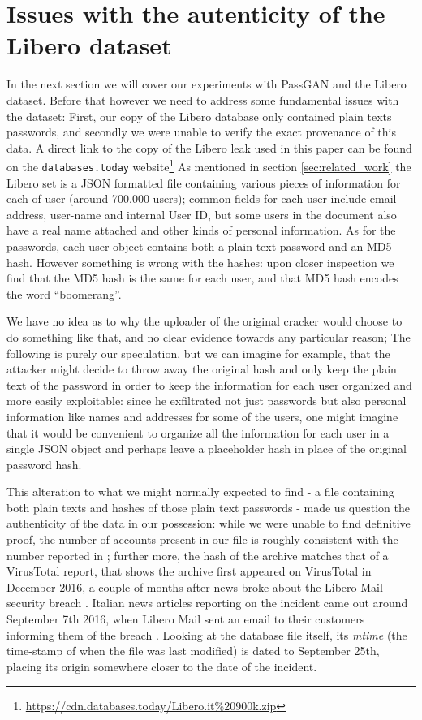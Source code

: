\section{Issues with the autenticity of the Libero dataset}\label{sec:libero}
In the next section we will cover our experiments with PassGAN and the Libero dataset.
Before that however we need to address some fundamental issues with the dataset: First, our copy of the Libero database only contained plain texts passwords, and secondly we were unable to verify the exact provenance of this data.
A direct link to the copy of the Libero leak used in this paper can be found on the \texttt{databases.today} website\footnote{\url{https://cdn.databases.today/Libero.it\%20900k.zip}}
As mentioned in section \ref{sec:related_work} the Libero set is a JSON formatted file containing various pieces of information for each of user (around 700,000 users); common fields for each user include email address, user-name and internal User ID, but some users in the document also have a real name attached and other kinds of personal information.  As for the passwords, each user object contains both a plain text password and an MD5 hash.
However something is wrong with the hashes: upon closer inspection we find that the MD5 hash is the same for each user, and that MD5 hash encodes the word \enquote{boomerang}.

We have no idea as to why the uploader of the original cracker would choose to do something like that, and no clear evidence towards any particular reason; The following is purely our speculation, but we can imagine for example, that the attacker might decide to throw away the original hash and only keep the plain text of the password in order to keep the information for each user organized and more easily exploitable: since he exfiltrated not just passwords but also personal information like names and addresses for some of the users, one might imagine that it would be convenient to organize all the information for each user in a single JSON object and perhaps leave a placeholder hash in place of the original password hash.

This alteration to what we might normally expected to find - a file containing both plain texts and hashes of those plain text passwords - made us question the authenticity of the data in our possession: while we were unable to find definitive proof, the number of accounts present in our file is roughly consistent with the number reported in \cite{libero_leak}; further more, the hash of the archive matches that of a VirusTotal report, that shows the archive first appeared on VirusTotal in December 2016, a couple of months after news broke about the Libero Mail security breach \cite{virus_total}.
Italian news articles reporting on the incident came out around September 7th 2016, when Libero Mail sent an email to their customers informing them of the breach \cite{libero-news-wired,libero-news-tomhw,libero-news-fanpage}.
Looking at the database file itself, its \emph{mtime} (the time-stamp of when the file was last modified) is dated to September 25th, placing its origin somewhere closer to the date of the incident. 

